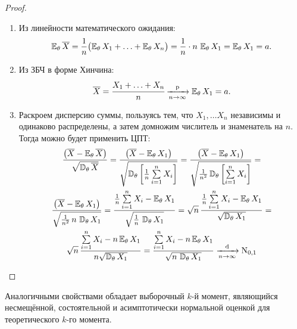 \begin{proof}
\begin{enumerate}[label={\arabic*.}]
    \item Из линейности математического ожидания:
    \begin{equation*}
        \operatorname{\operatorname{\mathbb{E}}_{\theta}} \overline{X}=\frac{1}{n}\bigl(\operatorname{\operatorname{\mathbb{E}}_{\theta}}  X_{1}+\ldots + \operatorname{\operatorname{\mathbb{E}}_{\theta}} X_{n}\bigr)=\frac{1}{n} \cdot n \, \operatorname{\operatorname{\mathbb{E}}_{\theta}} X_{1}= \operatorname{\operatorname{\mathbb{E}}_{\theta}}  X_{1} = a.
    \end{equation*}
    \item Из ЗБЧ в форме Хинчина:
    \begin{equation*}
        \overline{X} = 
        \cfrac{X_{1}+\ldots+X_{n}}{n} \xrightarrow[n \to \infty]{\text{p}} \operatorname{\operatorname{\mathbb{E}}_{\theta}} X_{1} = a.
    \end{equation*}

    \item Раскроем дисперсию суммы, пользуясь тем, что $X_1, \ldots X_n$ независимы и одинаково распределены, а затем домножим числитель и знаменатель на $n$. 
    Тогда можно будет применить ЦПТ:
    \begin{gather*}
        \frac{\bigl(\overline{X} - \operatorname{\operatorname{\mathbb{E}}_{\theta}} \overline{X} \bigr)}{\sqrt{\operatorname{\mathbb{D}_{\theta}} \overline{X}}} =
        \frac{\bigl(\overline{X} - \operatorname{\operatorname{\mathbb{E}}_{\theta}} X_{1}\bigr)}{\sqrt{\operatorname{\mathbb{D}_{\theta}} \left[ \frac{1}{n} \sum\limits_{i=1}^n X_i \right]}} = 
        \frac{\bigl(\overline{X} - \operatorname{\operatorname{\mathbb{E}}_{\theta}} X_{1}\bigr)}{\sqrt{\frac{1}{n^2} \operatorname{\mathbb{D}_{\theta}} \left[ \sum\limits_{i=1}^n X_i \right]}} = \\
        \frac{\bigl(\overline{X} - \operatorname{\operatorname{\mathbb{E}}_{\theta}} X_{1}\bigr)}{\sqrt{\frac{1}{n^2} \, n \, \operatorname{\mathbb{D}_{\theta}} X_1}} = 
        \frac{\frac{1}{n}\sum\limits_{i=1}^{n} X_{i} - \operatorname{\operatorname{\mathbb{E}}_{\theta}} X_{1}}{\sqrt{ \frac{1}{n} \, \operatorname{\mathbb{D}_{\theta}} X_1}} = 
        \sqrt{n} \, \frac{\frac{1}{n}\sum\limits_{i=1}^{n} X_{i} - \operatorname{\operatorname{\mathbb{E}}_{\theta}} X_{1}}{\sqrt{\operatorname{\mathbb{D}_{\theta}} X_1}} = \\
        \sqrt{n} \, \frac{\sum\limits_{i=1}^{n} X_{i} - n \operatorname{\operatorname{\mathbb{E}}_{\theta}} X_{1}}{n \sqrt{\operatorname{\mathbb{D}_{\theta}} X_1}} =
        \frac{\sum\limits_{i=1}^{n} X_{i} - n \operatorname{\operatorname{\mathbb{E}}_{\theta}} X_{1}}{\sqrt{n \, \operatorname{\mathbb{D}_{\theta}} X_1}} 
        \xrightarrow[n \to \infty]{\text{d}} \operatorname{\mathrm{N}}_{0, 1} 
    \end{gather*}
\end{enumerate}
\end{proof}

\begin{rmrk}
    Аналогичными свойствами обладает выборочный $k$-й момент, являющийся несмещённой, состоятельной и асимптотически нормальной оценкой для теоретического $k$-го момента.
\end{rmrk}

